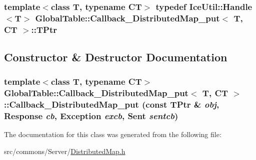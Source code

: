 \label{class_global_table_1_1_callback___distributed_map__put_a737246880284bb296cbf1ba7d00773ee}
\hypertarget{class_global_table_1_1_callback___distributed_map__put_a8d386ecbc957ae5842d8f2973a4c7521}{
\subsubsection[{TPtr}]{\setlength{\rightskip}{0pt plus 5cm}template$<$class T, typename CT$>$ typedef IceUtil::Handle$<$T$>$ {\bf GlobalTable::Callback\_\-DistributedMap\_\-put}$<$ T, CT $>$::{\bf TPtr}}}
\label{class_global_table_1_1_callback___distributed_map__put_a8d386ecbc957ae5842d8f2973a4c7521}


\subsection{Constructor \& Destructor Documentation}
\hypertarget{class_global_table_1_1_callback___distributed_map__put_a9d633085d71c5a605526c56240d5084d}{
\subsubsection[{Callback\_\-DistributedMap\_\-put}]{\setlength{\rightskip}{0pt plus 5cm}template$<$class T, typename CT$>$ {\bf GlobalTable::Callback\_\-DistributedMap\_\-put}$<$ T, CT $>$::{\bf Callback\_\-DistributedMap\_\-put} (const {\bf TPtr} \& {\em obj}, \/  {\bf Response} {\em cb}, \/  {\bf Exception} {\em excb}, \/  {\bf Sent} {\em sentcb})}}
\label{class_global_table_1_1_callback___distributed_map__put_a9d633085d71c5a605526c56240d5084d}


The documentation for this class was generated from the following file:\begin{DoxyCompactItemize}
\item 
src/commons/Server/\hyperlink{_distributed_map_8h}{DistributedMap.h}\end{DoxyCompactItemize}
